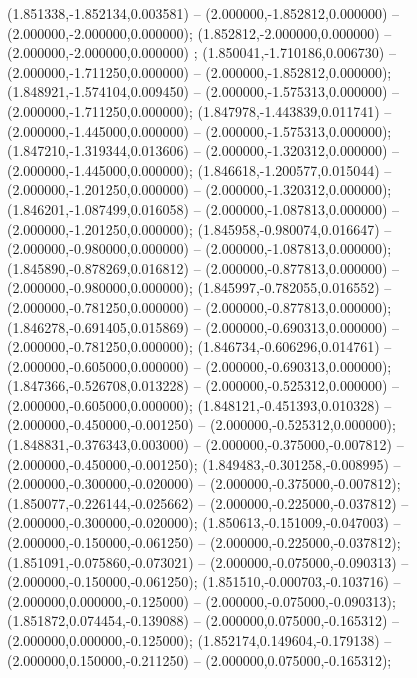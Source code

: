  (1.851338,-1.852134,0.003581) -- (2.000000,-1.852812,0.000000) -- (2.000000,-2.000000,0.000000);
 (1.852812,-2.000000,0.000000) -- (2.000000,-2.000000,0.000000) ;
 (1.850041,-1.710186,0.006730) -- (2.000000,-1.711250,0.000000) -- (2.000000,-1.852812,0.000000);
 (1.848921,-1.574104,0.009450) -- (2.000000,-1.575313,0.000000) -- (2.000000,-1.711250,0.000000);
 (1.847978,-1.443839,0.011741) -- (2.000000,-1.445000,0.000000) -- (2.000000,-1.575313,0.000000);
 (1.847210,-1.319344,0.013606) -- (2.000000,-1.320312,0.000000) -- (2.000000,-1.445000,0.000000);
 (1.846618,-1.200577,0.015044) -- (2.000000,-1.201250,0.000000) -- (2.000000,-1.320312,0.000000);
 (1.846201,-1.087499,0.016058) -- (2.000000,-1.087813,0.000000) -- (2.000000,-1.201250,0.000000);
 (1.845958,-0.980074,0.016647) -- (2.000000,-0.980000,0.000000) -- (2.000000,-1.087813,0.000000);
 (1.845890,-0.878269,0.016812) -- (2.000000,-0.877813,0.000000) -- (2.000000,-0.980000,0.000000);
 (1.845997,-0.782055,0.016552) -- (2.000000,-0.781250,0.000000) -- (2.000000,-0.877813,0.000000);
 (1.846278,-0.691405,0.015869) -- (2.000000,-0.690313,0.000000) -- (2.000000,-0.781250,0.000000);
 (1.846734,-0.606296,0.014761) -- (2.000000,-0.605000,0.000000) -- (2.000000,-0.690313,0.000000);
 (1.847366,-0.526708,0.013228) -- (2.000000,-0.525312,0.000000) -- (2.000000,-0.605000,0.000000);
 (1.848121,-0.451393,0.010328) -- (2.000000,-0.450000,-0.001250) -- (2.000000,-0.525312,0.000000);
 (1.848831,-0.376343,0.003000) -- (2.000000,-0.375000,-0.007812) -- (2.000000,-0.450000,-0.001250);
 (1.849483,-0.301258,-0.008995) -- (2.000000,-0.300000,-0.020000) -- (2.000000,-0.375000,-0.007812);
 (1.850077,-0.226144,-0.025662) -- (2.000000,-0.225000,-0.037812) -- (2.000000,-0.300000,-0.020000);
 (1.850613,-0.151009,-0.047003) -- (2.000000,-0.150000,-0.061250) -- (2.000000,-0.225000,-0.037812);
 (1.851091,-0.075860,-0.073021) -- (2.000000,-0.075000,-0.090313) -- (2.000000,-0.150000,-0.061250);
 (1.851510,-0.000703,-0.103716) -- (2.000000,0.000000,-0.125000) -- (2.000000,-0.075000,-0.090313);
 (1.851872,0.074454,-0.139088) -- (2.000000,0.075000,-0.165312) -- (2.000000,0.000000,-0.125000);
 (1.852174,0.149604,-0.179138) -- (2.000000,0.150000,-0.211250) -- (2.000000,0.075000,-0.165312);
